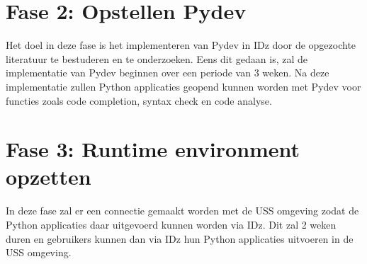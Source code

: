 \section{Fase 2: Opstellen Pydev}
\label{sec:m-opstellen-pydev}
Het doel in deze fase is het implementeren van Pydev in IDz door de opgezochte literatuur te bestuderen en te onderzoeken. Eens dit gedaan is, zal de implementatie van Pydev beginnen over een periode van 3 weken. Na deze implementatie zullen Python applicaties geopend kunnen worden met Pydev voor functies zoals code completion, syntax check en code analyse. 


\section{Fase 3: Runtime environment opzetten}
\label{sec:m-python-interpreter-opzetten}
In deze fase zal er een connectie gemaakt worden met de USS omgeving zodat de Python applicaties daar uitgevoerd kunnen worden via IDz. Dit zal 2 weken duren en gebruikers kunnen dan via IDz hun Python applicaties uitvoeren in de USS omgeving.
%    


